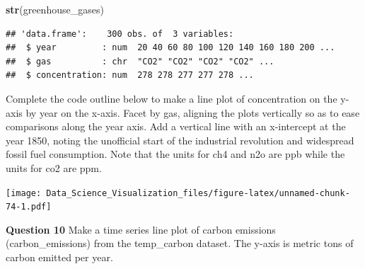 \documentclass[
]{article}
\newenvironment{Shaded}{\begin{snugshade}}{\end{snugshade}}
\newcommand{\DataTypeTok}[1]{\textcolor[rgb]{0.13,0.29,0.53}{#1}}
\newcommand{\DecValTok}[1]{\textcolor[rgb]{0.00,0.00,0.81}{#1}}
\newcommand{\KeywordTok}[1]{\textcolor[rgb]{0.13,0.29,0.53}{\textbf{#1}}}
\newcommand{\NormalTok}[1]{#1}
\newcommand{\OperatorTok}[1]{\textcolor[rgb]{0.81,0.36,0.00}{\textbf{#1}}}
\newcommand{\StringTok}[1]{\textcolor[rgb]{0.31,0.60,0.02}{#1}}
\begin{document}
\begin{Shaded}
\begin{Highlighting}[]
\KeywordTok{str}\NormalTok{(greenhouse_gases)}
\end{Highlighting}
\end{Shaded}

\begin{verbatim}
## 'data.frame':    300 obs. of  3 variables:
##  $ year         : num  20 40 60 80 100 120 140 160 180 200 ...
##  $ gas          : chr  "CO2" "CO2" "CO2" "CO2" ...
##  $ concentration: num  278 278 277 277 278 ...
\end{verbatim}

Complete the code outline below to make a line plot of concentration on
the y-axis by year on the x-axis. Facet by gas, aligning the plots
vertically so as to ease comparisons along the year axis. Add a vertical
line with an x-intercept at the year 1850, noting the unofficial start
of the industrial revolution and widespread fossil fuel consumption.
Note that the units for ch4 and n2o are ppb while the units for co2 are
ppm.

\begin{Shaded}
\end{Shaded}

\texttt{[image: Data\_Science\_Visualization\_files/figure-latex/unnamed-chunk-74-1.pdf]}

\textbf{Question 10} Make a time series line plot of carbon emissions
(carbon\_emissions) from the temp\_carbon dataset. The y-axis is metric
tons of carbon emitted per year.
\end{document}
